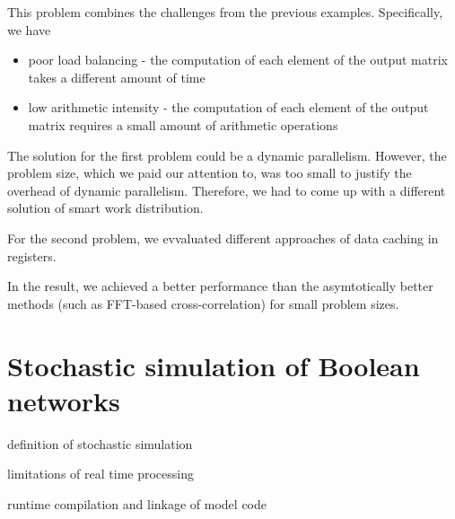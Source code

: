 This problem combines the challenges from the previous examples. Specifically, we have
\begin{itemize}
    \item poor load balancing - the computation of each element of the output matrix takes a different amount of time
    \item low arithmetic intensity - the computation of each element of the output matrix requires a small amount of arithmetic operations
\end{itemize}

The solution for the first problem could be a dynamic parallelism. However, the problem size, which we paid our attention to, was too small to justify the overhead of dynamic parallelism. Therefore, we had to come up with a different solution of smart work distribution.

For the second problem, we evvaluated different approaches of data caching in registers.

In the result, we achieved a better performance than the asymtotically better methods (such as FFT-based cross-correlation) for small problem sizes.

\section{Stochastic simulation of Boolean networks}

definition of stochastic simulation

limitations of real time processing

runtime compilation and linkage of model code
